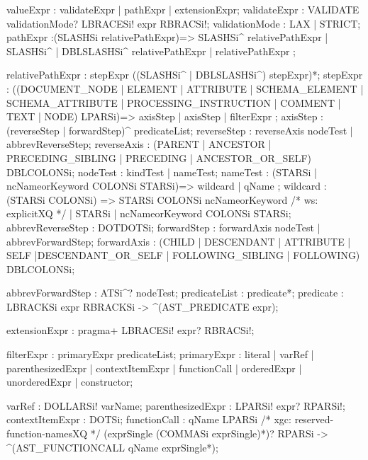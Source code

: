 valueExpr : validateExpr | pathExpr | extensionExpr;
  validateExpr : VALIDATE validationMode? LBRACESi! expr RBRACSi!;
    validationMode : LAX | STRICT;
  pathExpr :(SLASHSi relativePathExpr)=> SLASHSi^ relativePathExpr
            | SLASHSi^
            | DBLSLASHSi^ relativePathExpr
            | relativePathExpr
           ;

  relativePathExpr : stepExpr ((SLASHSi^ | DBLSLASHSi^) stepExpr)*;
    stepExpr :
              ((DOCUMENT_NODE | ELEMENT | ATTRIBUTE | SCHEMA_ELEMENT 
              | SCHEMA_ATTRIBUTE | PROCESSING_INSTRUCTION | COMMENT 
              | TEXT | NODE) LPARSi)=> 
              axisStep
              | axisStep
              | filterExpr
              ;
  axisStep : (reverseStep | forwardStep)^ predicateList;
    reverseStep : reverseAxis nodeTest | abbrevReverseStep;
      reverseAxis : (PARENT 
                     | ANCESTOR 
                     | PRECEDING_SIBLING 
                     | PRECEDING 
                     | ANCESTOR_OR_SELF) DBLCOLONSi;
  nodeTest : kindTest | nameTest;
    nameTest : (STARSi | ncNameorKeyword COLONSi STARSi)=>
              wildcard
              | qName 
            ;
  wildcard : (STARSi COLONSi) 
             => STARSi COLONSi ncNameorKeyword
                /* ws: explicitXQ */
                | STARSi
                | ncNameorKeyword COLONSi STARSi;
  abbrevReverseStep : DOTDOTSi;
    forwardStep : forwardAxis nodeTest | abbrevForwardStep;
       forwardAxis : (CHILD | DESCENDANT | ATTRIBUTE | SELF 
                     |DESCENDANT_OR_SELF | FOLLOWING_SIBLING 
                     | FOLLOWING) DBLCOLONSi;

  abbrevForwardStep : ATSi^? nodeTest;
    predicateList : predicate*;
      predicate : LBRACKSi expr RBRACKSi
                 -> ^(AST_PREDICATE expr);

  extensionExpr : pragma+ LBRACESi! expr? RBRACSi!; 

filterExpr : primaryExpr predicateList;
  primaryExpr : literal 
              | varRef 
              | parenthesizedExpr 
              | contextItemExpr 
              | functionCall 
              | orderedExpr 
              | unorderedExpr 
              | constructor;

    varRef : DOLLARSi! varName;
    parenthesizedExpr : LPARSi! expr? RPARSi!;
    contextItemExpr : DOTSi;
    functionCall : qName LPARSi /* xgc: reserved-function-namesXQ */
                  (exprSingle (COMMASi exprSingle)*)? 
                  RPARSi
                    -> ^(AST_FUNCTIONCALL qName exprSingle*);

